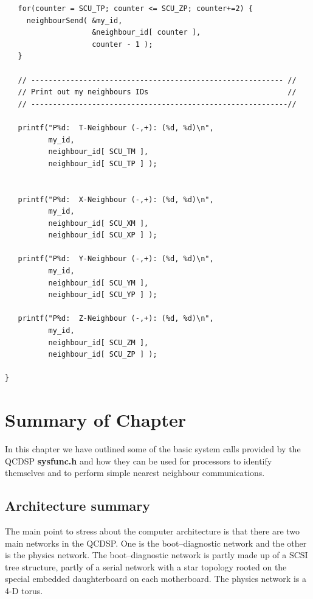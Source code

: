 {\begin{verbatim}
   for(counter = SCU_TP; counter <= SCU_ZP; counter+=2) {
     neighbourSend( &my_id,
                    &neighbour_id[ counter ],
                    counter - 1 );
   }

   // ---------------------------------------------------------- //
   // Print out my neighbours IDs                                //
   // -----------------------------------------------------------//

   printf("P%d:  T-Neighbour (-,+): (%d, %d)\n",
          my_id,
          neighbour_id[ SCU_TM ],
          neighbour_id[ SCU_TP ] );


   printf("P%d:  X-Neighbour (-,+): (%d, %d)\n",
          my_id,
          neighbour_id[ SCU_XM ],
          neighbour_id[ SCU_XP ] );

   printf("P%d:  Y-Neighbour (-,+): (%d, %d)\n",
          my_id,
          neighbour_id[ SCU_YM ],
          neighbour_id[ SCU_YP ] );

   printf("P%d:  Z-Neighbour (-,+): (%d, %d)\n",
          my_id,
          neighbour_id[ SCU_ZM ],
          neighbour_id[ SCU_ZP ] );

}
\end{verbatim}
}

\section{Summary of Chapter}
In this chapter we have outlined some of the basic system
calls provided by the QCDSP {\bf sysfunc.h} and how they
can be used for processors to identify themselves and to 
perform simple nearest neighbour communications.

\subsection{Architecture summary}
The main point to stress about the computer architecture is that
there are two main networks in the QCDSP. One is the boot--diagnostic
network and the other is the physics network. The boot--diagnostic 
network is partly made up of a SCSI tree structure, partly of a 
serial network with a star topology rooted on the special embedded
daughterboard on each motherboard. The physics network is a 4-D
torus.

